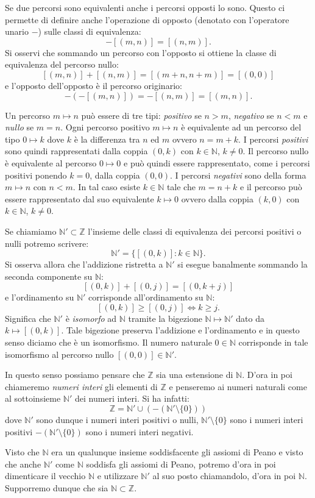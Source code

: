 \documentclass[italian,a4paper,hidelinks,headinclude]{scrartcl}
\newcommand{\NN}{{\mathbb N}}
\newcommand{\ZZ}{{\mathbb Z}}
\begin{document}
Se due percorsi sono equivalenti anche i percorsi opposti lo sono. Questo ci permette
di definire anche l'operazione di opposto (denotato con l'operatore unario $-$)
sulle classi di equivalenza:
\[
  -[(m,n)] = [(n,m)].
\]
Si osservi che sommando un percorso con l'opposto si ottiene la classe
di equivalenza del percorso nullo:
\[
  [(m,n)] + [(n, m)] = [(m+n,n+m)] = [(0,0)]
\]
e l'opposto dell'opposto è il percorso originario:
\[
  -(-[(m,n)]) = -[(n,m)] = [(m,n)].
\]

Un percorso $m\mapsto n$ può essere di tre tipi: \emph{positivo}
se $n>m$, \emph{negativo} se $n<m$ e \emph{nullo} se $m=n$.
Ogni percorso
positivo $m\mapsto n$ è equivalente ad un percorso del tipo $0\mapsto k$ dove
$k$ è la differenza tra $n$ ed $m$ ovvero $n=m+k$.
I percorsi \emph{positivi} sono quindi rappresentati dalla coppia $(0,k)$ con $k\in \NN$,
$k\neq 0$. Il percorso nullo è equivalente al percorso $0\mapsto 0$ e può quindi essere
rappresentato, come i percorsi positivi ponendo $k=0$, dalla coppia $(0,0)$.
I percorsi \emph{negativi} sono della forma $m\mapsto n$ con $n<m$. In tal caso esiste $k\in \NN$
tale che $m=n+k$ e il percorso può essere rappresentato dal suo equivalente $k \mapsto 0$ ovvero
dalla coppia $(k,0)$ con $k\in \NN$, $k\neq 0$.

Se chiamiamo $\NN'\subset \ZZ$ l'insieme delle classi di equivalenza
dei percorsi positivi o nulli potremo scrivere:
\[
  \NN' = \{[(0,k)]\colon k\in \NN\}.
\]
Si osserva allora che l'addizione ristretta a $\NN'$ si esegue
banalmente sommando la seconda componente su $\NN$:
\[
  [(0,k)] + [(0,j)] = [(0,k+j)]
\]
e l'ordinamento su $\NN'$ corrisponde all'ordinamento su $\NN$:
\[
  [(0,k)] \ge [(0,j)] \iff k \ge j.
\]
Significa che $\NN'$ è \emph{isomorfo} ad $\NN$ tramite la bigezione
$\NN\mapsto \NN'$ dato da $k\mapsto [(0,k)]$. Tale bigezione
preserva l'addizione e l'ordinamento e in questo senso diciamo che è un
isomorfismo. Il numero naturale $0\in \NN$ corrisponde in tale isomorfismo
al percorso nullo $[(0,0)]\in \NN'$.

In questo senso possiamo pensare che $\ZZ$ sia una estensione di $\NN$.
D'ora in poi chiameremo \emph{numeri interi} gli elementi di $\ZZ$
e penseremo ai numeri naturali come al sottoinsieme $\NN'$ dei numeri
interi.
Si ha infatti:
\[
  \ZZ = \NN' \cup (-(\NN'\setminus\{0\}))
\]
dove $\NN'$ sono dunque i numeri interi positivi o nulli, $\NN'\setminus\{0\}$
sono i numeri interi positivi $-(\NN'\setminus\{0\})$ sono i numeri interi
negativi.

Visto che $\NN$ era un qualunque insieme soddisfacente gli assiomi di Peano
e visto che anche $\NN'$ come $\NN$ soddisfa gli assiomi di Peano,
potremo d'ora in poi dimenticare il vecchio $\NN$ e utilizzare $\NN'$ al suo
posto chiamandolo, d'ora in poi $\NN$. Supporremo dunque che sia
$\NN \subset \ZZ$.
\end{document}
